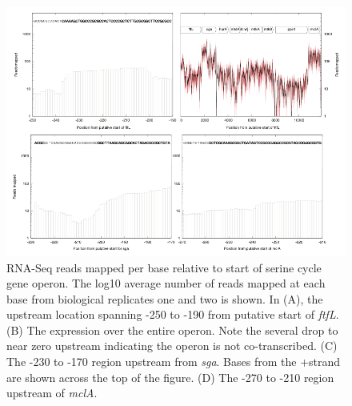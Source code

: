 \begin{figure}[H]
\centering
     \includegraphics[width=1.0\textwidth]{./tex/chapter1/figures/supplemental/FigureS4.png}
     \begin{singlespace}
     \caption[RNA-Seq reads mapped per base relative to start of serine cycle gene operon.]{
        RNA-Seq reads mapped per base relative to start of serine cycle gene operon.
        The log10 average number of reads mapped at each base from biological replicates one and two is shown.
        In (A), the upstream location spanning -250 to -190 from putative start of \textit{ftfL}.
        (B) The expression over the entire operon.
        Note the several drop to near zero upstream indicating the operon is not co-transcribed.
        (C) The -230 to -170 region upstream from \textit{sga}.
        Bases from the +strand are shown across the top of the figure.
        (D) The -270 to -210 region upstream of \textit{mclA}.
        }
     \label{fig:S4} %
     \end{singlespace}
\end{figure}


